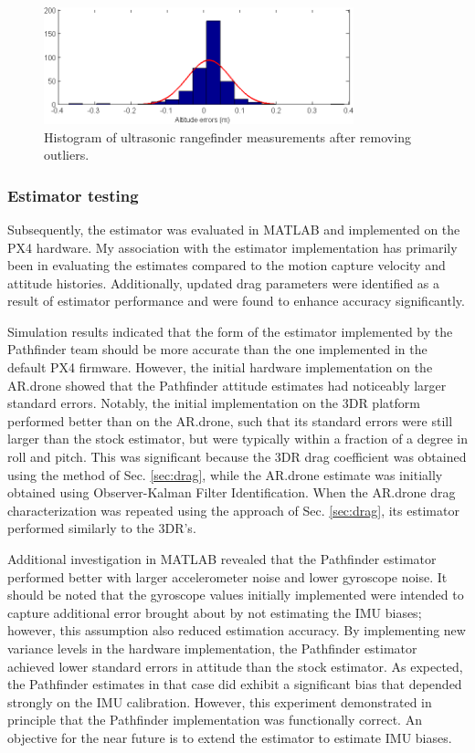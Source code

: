 \documentclass{article}
\begin{document}
\begin{figure}[tb!]
\centering
\includegraphics[width=0.8\textwidth]{../../sensor characterization/moving_flying_alt_hist.png}
\caption{Histogram of ultrasonic rangefinder measurements after removing outliers.}
\label{fig:movingflyingalthist}
\end{figure}

\subsubsection{Estimator testing}

Subsequently, the estimator was evaluated in MATLAB and implemented on the PX4 hardware. My association with the estimator implementation has primarily been in evaluating the estimates compared to the motion capture velocity and attitude histories. Additionally, updated drag parameters were identified as a result of estimator performance and were found to enhance accuracy significantly.

Simulation results indicated that the form of the estimator implemented by the Pathfinder team should be more accurate than the one implemented in the default PX4 firmware. However, the initial hardware implementation on the AR.drone showed that the Pathfinder attitude estimates had noticeably larger standard errors. Notably, the initial implementation on the 3DR platform performed better than on the AR.drone, such that its standard errors were still larger than the stock estimator, but were typically within a fraction of a degree in roll and pitch. This was significant because the 3DR drag coefficient was obtained using the method of Sec. \ref{sec:drag}, while the AR.drone estimate was initially obtained using Observer-Kalman Filter Identification. When the AR.drone drag characterization was repeated using the approach of Sec. \ref{sec:drag}, its estimator performed similarly to the 3DR's.

Additional investigation in MATLAB revealed that the Pathfinder estimator performed better with larger accelerometer noise and lower gyroscope noise. It should be noted that the gyroscope values initially implemented were intended to capture additional error brought about by not estimating the IMU biases; however, this assumption also reduced estimation accuracy. By implementing new variance levels in the hardware implementation, the Pathfinder estimator achieved lower standard errors in attitude than the stock estimator. As expected, the Pathfinder estimates in that case did exhibit a significant bias that depended strongly on the IMU calibration. However, this experiment demonstrated in principle that the Pathfinder implementation was functionally correct. An objective for the near future is to extend the estimator to estimate IMU biases.
\end{document}

